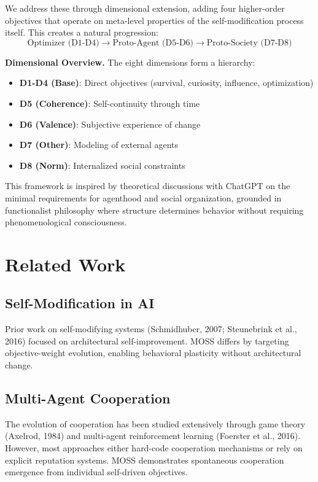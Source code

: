 \documentclass{article}
\begin{document}
We address these through dimensional extension, adding four higher-order objectives that operate on meta-level properties of the self-modification process itself. This creates a natural progression:
\begin{equation}
    \text{Optimizer (D1-D4)} \rightarrow \text{Proto-Agent (D5-D6)} \rightarrow \text{Proto-Society (D7-D8)}
\end{equation}

\textbf{Dimensional Overview.} The eight dimensions form a hierarchy:
\begin{itemize}
    \item \textbf{D1-D4 (Base)}: Direct objectives (survival, curiosity, influence, optimization)
    \item \textbf{D5 (Coherence)}: Self-continuity through time
    \item \textbf{D6 (Valence)}: Subjective experience of change
    \item \textbf{D7 (Other)}: Modeling of external agents
    \item \textbf{D8 (Norm)}: Internalized social constraints
\end{itemize}

This framework is inspired by theoretical discussions with ChatGPT on the minimal requirements for agenthood and social organization, grounded in functionalist philosophy where structure determines behavior without requiring phenomenological consciousness.

\section{Related Work}

\subsection{Self-Modification in AI}
Prior work on self-modifying systems (Schmidhuber, 2007; Steunebrink et al., 2016) focused on architectural self-improvement. MOSS differs by targeting objective-weight evolution, enabling behavioral plasticity without architectural change.

\subsection{Multi-Agent Cooperation}
The evolution of cooperation has been studied extensively through game theory (Axelrod, 1984) and multi-agent reinforcement learning (Foerster et al., 2016). However, most approaches either hard-code cooperation mechanisms or rely on explicit reputation systems. MOSS demonstrates spontaneous cooperation emergence from individual self-driven objectives.
\end{document}
